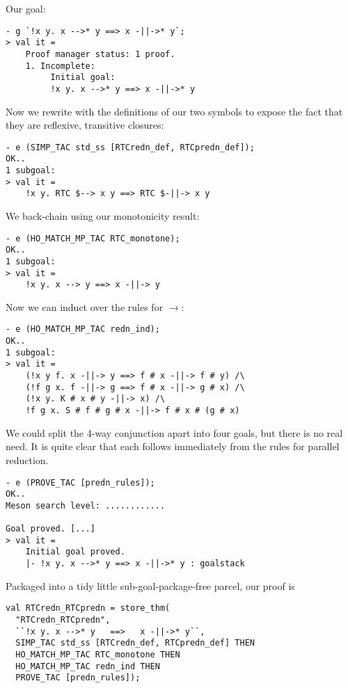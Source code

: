 Our goal:
\begin{session}
\begin{verbatim}
- g `!x y. x -->* y ==> x -||->* y`;
> val it =
    Proof manager status: 1 proof.
    1. Incomplete:
         Initial goal:
         !x y. x -->* y ==> x -||->* y
\end{verbatim}
\end{session}
Now we rewrite with the definitions of our two symbols to expose the
fact that they are reflexive, transitive closures:
\begin{session}
\begin{verbatim}
- e (SIMP_TAC std_ss [RTCredn_def, RTCpredn_def]);
OK..
1 subgoal:
> val it =
    !x y. RTC $--> x y ==> RTC $-||-> x y
\end{verbatim}
\end{session}
We back-chain using our monotonicity result:
\begin{session}
\begin{verbatim}
- e (HO_MATCH_MP_TAC RTC_monotone);
OK..
1 subgoal:
> val it =
    !x y. x --> y ==> x -||-> y
\end{verbatim}
\end{session}
Now we can induct over the rules for $\rightarrow$:
\begin{session}
\begin{verbatim}
- e (HO_MATCH_MP_TAC redn_ind);
OK..
1 subgoal:
> val it =
    (!x y f. x -||-> y ==> f # x -||-> f # y) /\
    (!f g x. f -||-> g ==> f # x -||-> g # x) /\
    (!x y. K # x # y -||-> x) /\
    !f g x. S # f # g # x -||-> f # x # (g # x)
\end{verbatim}
\end{session}
We could split the 4-way conjunction apart into four goals, but there
is no real need.  It is quite clear that each follows immediately from
the rules for parallel reduction.
\begin{session}
\begin{verbatim}
- e (PROVE_TAC [predn_rules]);
OK..
Meson search level: ............

Goal proved. [...]
> val it =
    Initial goal proved.
    |- !x y. x -->* y ==> x -||->* y : goalstack
\end{verbatim}
\end{session}
Packaged into a tidy little sub-goal-package-free parcel, our proof is
\begin{session}
\begin{verbatim}
val RTCredn_RTCpredn = store_thm(
  "RTCredn_RTCpredn",
  ``!x y. x -->* y   ==>   x -||->* y``,
  SIMP_TAC std_ss [RTCredn_def, RTCpredn_def] THEN
  HO_MATCH_MP_TAC RTC_monotone THEN
  HO_MATCH_MP_TAC redn_ind THEN
  PROVE_TAC [predn_rules]);
\end{verbatim}
\end{session}
\eos{}

